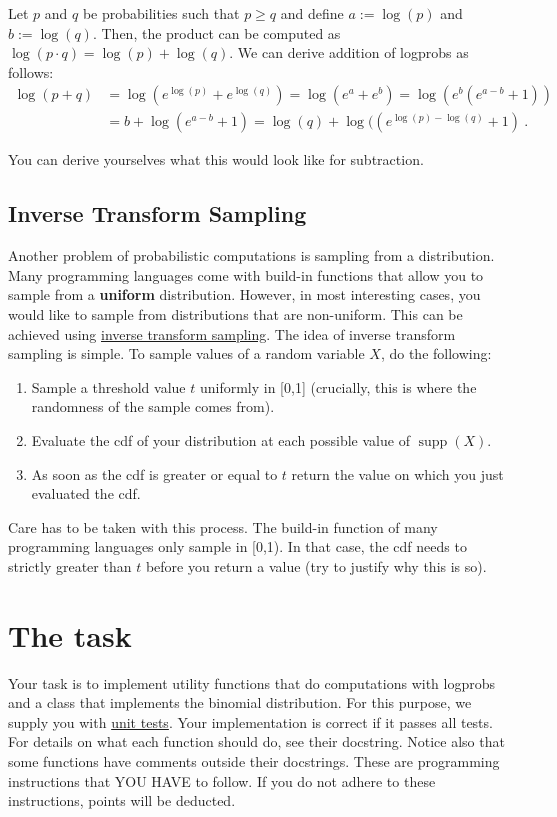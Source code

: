 \documentclass[11pt, leqno, a4paper]{article}
\newcommand{\supp}{\operatorname{supp}}
\begin{document}
Let $ p $ and $ q $ be probabilities such that
$ p \geq q $ and define $ a := \log(p) $ and $ b := \log(q) $. Then,
the product can be computed as $\log(p \cdot q) = \log(p) + \log(q)$.
We can derive addition of logprobs as follows: 
\begin{align}
\log(p + q) &= \log \left( e^{\log(p)} + e^{\log(q)} \right) = \log \left( e^{a} + e^{b} \right)
= \log \left(e^{b} ( e^{a-b} + 1) \right) \\ 
&= b + \log \left( e^{a-b} + 1 \right) 
=\log(q) + \log (\left( e^{\log(p)-\log(q)} + 1 \right) \nonumber \ .
\end{align}

You can derive yourselves what this would look like for subtraction.

\subsection{Inverse Transform Sampling}
Another problem of probabilistic computations is sampling from a distribution. Many programming languages
come with build-in functions that allow you to sample from a \textbf{uniform} distribution. However,
in most interesting cases, you would like to sample from distributions that are non-uniform. This can
be achieved using 
\href{https://en.wikipedia.org/wiki/Inverse_transform_sampling}{inverse transform sampling}. The idea of 
inverse transform sampling is simple. To sample values of a random variable $ X $, do the following:
\begin{enumerate}
\item Sample a threshold value $ t $ uniformly in [0,1] (crucially, this is where the randomness of the 
sample comes from).
\item Evaluate the cdf of your distribution at each possible value of $ \supp(X) $.
\item As soon as the cdf is greater or equal to $ t $ return the value on which you just evaluated the cdf.
\end{enumerate}

Care has to be taken with this process. The build-in function of many programming languages only
sample in [0,1). In that case, the cdf needs to strictly greater than $ t $ before you return a value (try
to justify why this is so).

\section{The task}
Your task is to implement utility functions that do computations with logprobs and a class that 
implements the binomial distribution. For this purpose, we
supply you with \href{https://docs.python.org/2/library/unittest.html}{unit tests}. 
Your implementation is correct if it passes all tests. For details on
what each function should do, see their docstring. Notice also that some functions have comments
outside their docstrings. These are programming instructions that YOU HAVE to follow. If you do
not adhere to these instructions, points will be deducted.
\end{document}
